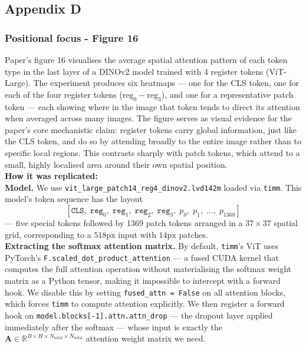 \documentclass[12pt]{article}
\begin{document}
\subsection{Appendix D}
\subsubsection{Positional focus - Figure 16}
Paper's figure 16 visualises the average spatial attention pattern of each token type in the last layer of a DINOv2 model trained with 4 register tokens (ViT-Large). The experiment produces six heatmaps — one for the CLS token, one for each of the four register tokens ($\text{reg}_0 - \text{reg}_3$), and one for a representative patch token — each showing where in the image that token tends to direct its attention when averaged across many images.
The figure serves as visual evidence for the paper's core mechanistic claim: register tokens carry global information, just like the CLS token, and do so by attending broadly to the entire image rather than to specific local regions. This contrasts sharply with patch tokens, which attend to a small, highly localised area around their own spatial position.\\
\textbf{How it was replicated:}\\
\textbf{Model.} We use \texttt{vit\_large\_patch14\_reg4\_dinov2.lvd142m} loaded via \texttt{timm}. This model's token sequence has the layout
\[
    [\texttt{CLS},\; \texttt{reg}_0,\; \texttt{reg}_1,\; \texttt{reg}_2,\; \texttt{reg}_3,\; p_0,\; p_1,\; \ldots,\; p_{1368}]
\]
--- five special tokens followed by 1369 patch tokens arranged in a $37 \times 37$ spatial grid, corresponding to a $518\text{px}$ input with $14\text{px}$ patches.\\
\textbf{Extracting the softmax attention matrix.} By default, \texttt{timm}'s ViT uses PyTorch's \texttt{F.scaled\_dot\_product\_attention} --- a fused CUDA kernel that computes the full attention operation without materialising the softmax weight matrix as a Python tensor, making it impossible to intercept with a forward hook. We disable this by setting \texttt{fused\_attn = False} on all attention blocks, which forces \texttt{timm} to compute attention explicitly. We then register a forward hook on \texttt{model.blocks[-1].attn.attn\_drop} --- the dropout layer applied immediately after the softmax --- whose input is exactly the $\mathbf{A} \in \mathbb{R}^{B \times H \times N_{\mathrm{total}} \times N_{\mathrm{total}}}$ attention weight matrix we need.\\
\end{document}
